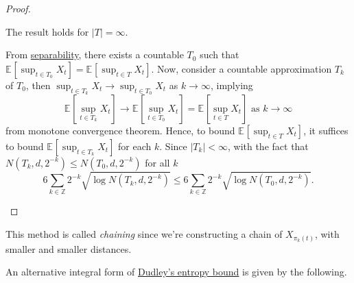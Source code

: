 \begin{proof}
	\begin{claim}
		The result holds for \(\vert T \vert = \infty \).
	\end{claim}
	\begin{explanation}
		From \hyperref[def:separable]{separability}, there exists a countable \(T_0\) such that \(\mathbb{E}_{}\left[\sup _{t\in T_0} X_t \right] = \mathbb{E}_{}\left[\sup _{t\in T} X_t \right] \). Now, consider a countable approximation \(T_k\) of \(T_0\), then \(\sup _{t\in T_k} X_t \to \sup _{t\in T_0} X_t \) as \(k \to \infty\), implying
		\[
			\mathbb{E}_{}\left[\sup _{t\in T_k} X_t \right] \to  \mathbb{E}_{}\left[\sup _{t\in T_0} X_t \right] = \mathbb{E}_{}\left[\sup _{t\in T} X_t \right] \text{ as }k \to \infty
		\]
		from monotone convergence theorem. Hence, to bound \(\mathbb{E}_{}\left[\sup _{t\in T} X_t \right] \), it suffices to bound \(\mathbb{E}_{}\left[\sup _{t\in T_k} X_t \right] \) for each \(k\). Since \(\vert T_k \vert < \infty \), with the fact that \(N(T_k, d, 2^{-k}) \leq N(T_0, d, 2^{-k})\) for all \(k\)
		\[
			6 \sum_{k\in \mathbb{Z} } 2^{-k} \sqrt{\log N(T_k, d, 2^{-k})} \leq 6 \sum_{k\in \mathbb{Z} } 2^{-k} \sqrt{\log N(T_0, d, 2^{-k})} .
		\]
	\end{explanation}
\end{proof}

\begin{note}\label{note:chaining}
	This method is called \emph{chaining} since we're constructing a chain of \(X_{\pi _{k}(t)}\), with smaller and smaller distances.
	\begin{figure}[H]
		\centering
	\end{figure}
\end{note}

An alternative integral form of \hyperref[thm:Dudley-entropy-bound]{Dudley's entropy bound} is given by the following.

